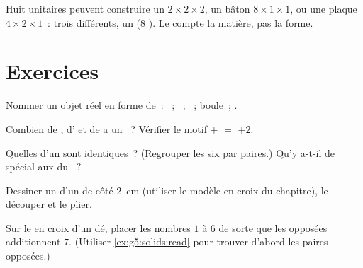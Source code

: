 \begin{example}\label{ex:g5:solids:rearrange}
Huit  unitaires peuvent construire un  $2 \times 2 \times 2$,
un bâton $8 \times 1 \times 1$, ou une plaque $4 \times 2 \times 1$~:
trois  différents, un  ($8$ ). Le  compte
la matière, pas la forme.
\end{example}

\section{Exercices}

\begin{exercise}[$\star$]\label{exo:g5:solids:1}
Nommer un objet réel en forme de~: ~; ~; ~; boule~;
.
\end{exercise}

\begin{exercise}[$\star$]\label{exo:g5:solids:2}
Combien de , d' et de  a un ~? Vérifier le
motif  $+$  $=$  $+ 2$.
\end{exercise}

\begin{exercise}[$\star$]\label{exo:g5:solids:3}
Quelles  d'un  sont identiques~? (Regrouper les six 
par paires.) Qu'y a-t-il de spécial aux  du ~?
\end{exercise}

\begin{exercise}[$\star$]\label{exo:g5:solids:4}
Dessiner un  d'un  de côté $2$~cm (utiliser le modèle en
croix du chapitre), le découper et le plier.
\end{exercise}

\begin{exercise}[$\star$]\label{exo:g5:solids:5}
Sur le  en croix d'un dé, placer les nombres $1$ à $6$ de
sorte que les  opposées additionnent $7$. (Utiliser
\cref{ex:g5:solids:read} pour trouver d'abord les paires
opposées.)
\end{exercise}

